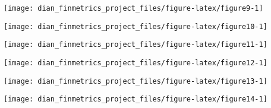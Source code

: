 \documentclass[11pt,preprint, authoryear]{elsarticle}
\let\origfigure\figure
\let\endorigfigure\endfigure
\renewenvironment{figure}[1][2] {
    \expandafter\origfigure\expandafter[H]
} {
    \endorigfigure
}
\numberwithin{equation}{section}
\numberwithin{figure}{section}
\numberwithin{table}{section}
\begin{document}
\begin{figure}[H]

{\centering \texttt{[image: dian\_finmetrics\_project\_files/figure-latex/figure9-1]} 

}

\caption{Dynanmic correlation \label{figure9}}\label{fig:figure9}
\end{figure}

\begin{figure}[H]

{\centering \texttt{[image: dian\_finmetrics\_project\_files/figure-latex/figure10-1]} 

}

\caption{Dynanmic correlation \label{figure10}}\label{fig:figure10}
\end{figure}

\begin{figure}[H]

{\centering \texttt{[image: dian\_finmetrics\_project\_files/figure-latex/figure11-1]} 

}

\caption{Dynanmic correlation \label{figure11}}\label{fig:figure11}
\end{figure}

\begin{figure}[H]

{\centering \texttt{[image: dian\_finmetrics\_project\_files/figure-latex/figure12-1]} 

}

\caption{Dynanmic correlation \label{figure12}}\label{fig:figure12}
\end{figure}

\begin{figure}[H]

{\centering \texttt{[image: dian\_finmetrics\_project\_files/figure-latex/figure13-1]} 

}

\caption{Dynanmic correlation \label{figure13}}\label{fig:figure13}
\end{figure}

\begin{figure}[H]

{\centering \texttt{[image: dian\_finmetrics\_project\_files/figure-latex/figure14-1]} 

}

\caption{Dynanmic correlation \label{figure14}}\label{fig:figure14}
\end{figure}

\newpage
\end{document}
